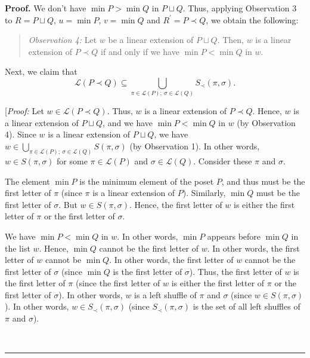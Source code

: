 \documentclass[numbers=enddot,12pt,final,onecolumn,notitlepage]{scrartcl}%
\theoremstyle{definition}
\newenvironment{statement}{\begin{quote}}{\end{quote}}
\newenvironment{proof}[1][Proof]{\noindent\textbf{#1.} }{\ \rule{0.5em}{0.5em}}
\newenvironment{verlong}{}{}
\begin{document}
\begin{verlong}
\begin{proof}
We don't have $\min P>\min Q$ in $P\sqcup Q$. Thus, applying Observation 3 to
$R=P\sqcup Q$, $u=\min P$, $v=\min Q$ and $R^{\prime}=P\left.  \prec\right.
Q$, we obtain the following:

\begin{statement}
\textit{Observation 4:} Let $w$ be a linear extension of $P\sqcup Q$. Then,
$w$ is a linear extension of $P\left.  \prec\right.  Q$ if and only if we have
$\min P<\min Q$ in $w$.
\end{statement}

Next, we claim that
\begin{equation}
\mathcal{L}\left(  P\left.  \prec\right.  Q\right)  \subseteq\bigcup_{\pi
\in\mathcal{L}\left(  P\right)  ;\ \sigma\in\mathcal{L}\left(  Q\right)
}S_{\prec}\left(  \pi,\sigma\right)  .\label{pf.lem.dendri.4.1.lem2.a.5}%
\end{equation}


[\textit{Proof:} Let $w\in\mathcal{L}\left(  P\left.  \prec\right.  Q\right)
$. Thus, $w$ is a linear extension of $P\left.  \prec\right.  Q$. Hence, $w$
is a linear extension of $P\sqcup Q$, and we have $\min P<\min Q$ in $w$ (by
Observation 4). Since $w$ is a linear extension of $P\sqcup Q$, we have
$w\in\bigcup_{\pi\in\mathcal{L}\left(  P\right)  ;\ \sigma\in\mathcal{L}%
\left(  Q\right)  }S\left(  \pi,\sigma\right)  $ (by Observation 1). In other
words, $w\in S\left(  \pi,\sigma\right)  $ for some $\pi\in\mathcal{L}\left(
P\right)  $ and $\sigma\in\mathcal{L}\left(  Q\right)  $. Consider these $\pi$
and $\sigma$.

The element $\min P$ is the minimum element of the poset $P$, and thus must be
the first letter of $\pi$ (since $\pi$ is a linear extension of $P$).
Similarly, $\min Q$ must be the first letter of $\sigma$. But $w\in S\left(
\pi,\sigma\right)  $. Hence, the first letter of $w$ is either the first
letter of $\pi$ or the first letter of $\sigma$.

We have $\min P<\min Q$ in $w$. In other words, $\min P$ appears before $\min
Q$ in the list $w$. Hence, $\min Q$ cannot be the first letter of $w$. In
other words, the first letter of $w$ cannot be $\min Q$. In other words, the
first letter of $w$ cannot be the first letter of $\sigma$ (since $\min Q$ is
the first letter of $\sigma$). Thus, the first letter of $w$ is the first
letter of $\pi$ (since the first letter of $w$ is either the first letter of
$\pi$ or the first letter of $\sigma$). In other words, $w$ is a left shuffle
of $\pi$ and $\sigma$ (since $w\in S\left(  \pi,\sigma\right)  $). In other
words, $w\in S_{\prec}\left(  \pi,\sigma\right)  $ (since $S_{\prec}\left(
\pi,\sigma\right)  $ is the set of all left shuffles of $\pi$ and $\sigma$).


\end{proof}
\end{verlong}
\end{document}
